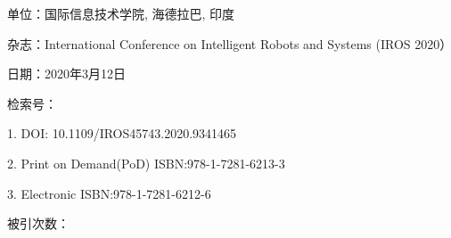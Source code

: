 \documentclass[lang=cn,11pt]{elegantpaper}
\begin{document}
单位：国际信息技术学院, 海德拉巴, 印度

杂志：International Conference on Intelligent Robots and Systems (IROS 2020）

日期：2020年3月12日

检索号：  

1. DOI: 10.1109/IROS45743.2020.9341465   

2. Print on Demand(PoD) ISBN:978-1-7281-6213-3  

3. Electronic ISBN:978-1-7281-6212-6   

被引次数：


\nocite{*}

%
\end{document}
